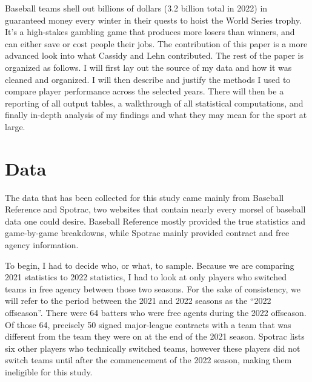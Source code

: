 \documentclass[10pt]{article}
\begin{document}
Baseball teams shell out billions of dollars (3.2 billion total in 2022) in guaranteed money every winter in their quests to 
hoist the World Series trophy. It’s a high-stakes gambling game that produces more losers than winners, and can either save or 
cost people their jobs. The contribution of this paper is a more advanced look into what Cassidy and Lehn contributed. The rest 
of the paper is organized as follows. I will first lay out the source of my data and how it was cleaned and organized. I will 
then describe and justify the methods I used to compare player performance across the selected years. There will then be a 
reporting of all output tables, a walkthrough of all statistical computations, and finally in-depth analysis of my findings 
and what they may mean for the sport at large. 

\section{Data}
The data that has been collected for this study came mainly from Baseball Reference and Spotrac, two websites that contain 
nearly every morsel of baseball data one could desire. Baseball Reference mostly provided the true statistics and game-by-game 
breakdowns, while Spotrac mainly provided contract and free agency information. 

To begin, I had to decide who, or what, to sample. Because we are comparing 2021 statistics to 2022 statistics, I had to look 
at only players who switched teams in free agency between those two seasons. For the sake of consistency, we will refer to the 
period between the 2021 and 2022 seasons as the “2022 offseason”. There were 64 batters who were free agents during the 2022 
offseason. Of those 64, precisely 50 signed major-league contracts with a team that was different from the team they were on 
at the end of the 2021 season. Spotrac lists six other players who technically switched teams, however these players did not 
switch teams until after the commencement of the 2022 season, making them ineligible for this study.
\end{document}
